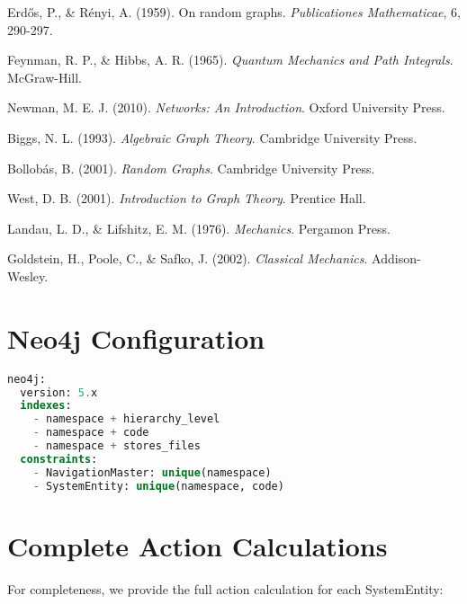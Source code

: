 \documentclass[12pt,a4paper]{article}
\begin{document}

\begin{thebibliography}{10}

Erdős, P., \& Rényi, A. (1959).
\newblock On random graphs.
\newblock \emph{Publicationes Mathematicae}, 6, 290-297.

Feynman, R. P., \& Hibbs, A. R. (1965).
\newblock \emph{Quantum Mechanics and Path Integrals}.
\newblock McGraw-Hill.

Newman, M. E. J. (2010).
\newblock \emph{Networks: An Introduction}.
\newblock Oxford University Press.

Biggs, N. L. (1993).
\newblock \emph{Algebraic Graph Theory}.
\newblock Cambridge University Press.

Bollobás, B. (2001).
\newblock \emph{Random Graphs}.
\newblock Cambridge University Press.

West, D. B. (2001).
\newblock \emph{Introduction to Graph Theory}.
\newblock Prentice Hall.

Landau, L. D., \& Lifshitz, E. M. (1976).
\newblock \emph{Mechanics}.
\newblock Pergamon Press.

Goldstein, H., Poole, C., \& Safko, J. (2002).
\newblock \emph{Classical Mechanics}.
\newblock Addison-Wesley.

\end{thebibliography}

\appendix

\section{Neo4j Configuration}

\begin{lstlisting}[language=SQL]
neo4j:
  version: 5.x
  indexes:
    - namespace + hierarchy_level
    - namespace + code
    - namespace + stores_files
  constraints:
    - NavigationMaster: unique(namespace)
    - SystemEntity: unique(namespace, code)
\end{lstlisting}

\section{Complete Action Calculations}

For completeness, we provide the full action calculation for each SystemEntity:
\end{document}
